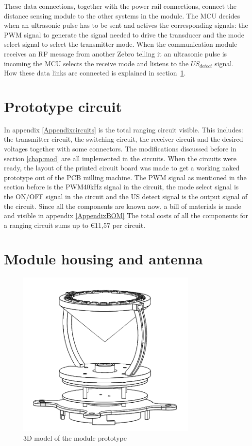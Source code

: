 These data connections, together with the power rail connections, connect the distance sensing module to the other systems in the module.
The MCU decides when an ultrasonic pulse has to be sent and actives the corresponding signals: the PWM signal to generate the signal needed to drive the transducer and the mode select signal to select the transmitter mode.
When the communication module receives an RF message from another Zebro telling it an ultrasonic pulse is incoming the MCU selects the receive mode and listens to the $US_{detect}$ signal.
How these data links are connected is explained in section~\ref{sec:proto_circuit}.

\section{Prototype circuit}
\label{sec:proto_circuit}

In appendix \ref{Appendixcircuits} is the total ranging circuit visible. This includes: the transmitter circuit, the switching circuit, the receiver circuit and the desired voltages together with some connectors. The modifications discussed before in section \ref{chap:mod} are all implemented in the circuits. When the circuits were ready, the layout of the printed circuit board was made to get a working naked prototype out of the PCB milling machine. The PWM signal as mentioned in the section before is the PWM40kHz signal in the circuit, the mode select signal is the ON/OFF signal in the circuit and the US detect signal is the output signal of the circuit.
Since all the components are known now, a bill of materials is made and visible in appendix \ref{AppendixBOM}
The total costs of all the components for a ranging circuit sums up to \euro11,57 per circuit.


\section{Module housing and antenna}
\label{sec:antennamech}

\begin{figure}[H]
\centering
\includegraphics[width=0.8\textwidth]{Figures/prototype_ant.PNG}
\caption{3D model of the module prototype}
\label{fig:proto_module}
\end{figure}


